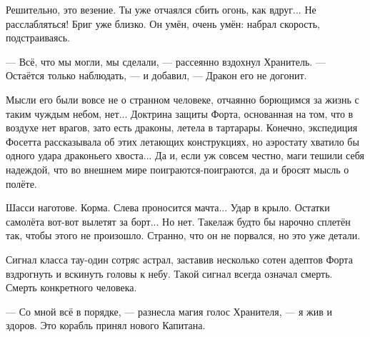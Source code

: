 \emptypar

Решительно, это везение. Ты уже отчаялся сбить огонь, как вдруг... Не расслабляться! Бриг уже близко.
Он умён, очень умён: набрал скорость, подстраиваясь.

\emptypar

--- Всё, что мы могли, мы сделали, --- рассеянно вздохнул Хранитель.
--- Остаётся только наблюдать, --- и добавил, --- Дракон его не догонит.

Мысли его были вовсе не о странном человеке, отчаянно борющимся за жизнь с таким чуждым небом, нет...
Доктрина защиты Форта, основанная на том, что в воздухе нет врагов, зато есть драконы, летела в тартарары.
Конечно, экспедиция Фосетта рассказывала об этих летающих конструкциях, но аэростату хватило бы одного удара драконьего хвоста...
Да и, если уж совсем честно, маги тешили себя надеждой, что во внешнем мире поиграются-поиграются, да и бросят мысль о полёте.

\emptypar

Шасси наготове. Корма. Слева проносится мачта... Удар в крыло. Остатки самолёта вот-вот вылетят за борт...
Но нет. Такелаж будто бы нарочно сплетён так, чтобы этого не произошло. Странно, что он не порвался, но это уже детали.

\emptypar

Сигнал класса тау-один сотряс астрал, заставив несколько сотен адептов Форта вздрогнуть и вскинуть головы к небу.
Такой сигнал всегда означал смерть. Смерть конкретного человека.

--- Со мной всё в порядке, --- разнесла магия голос Хранителя, --- я жив и здоров. Это корабль принял нового Капитана.

\emptypar


\emptypar
